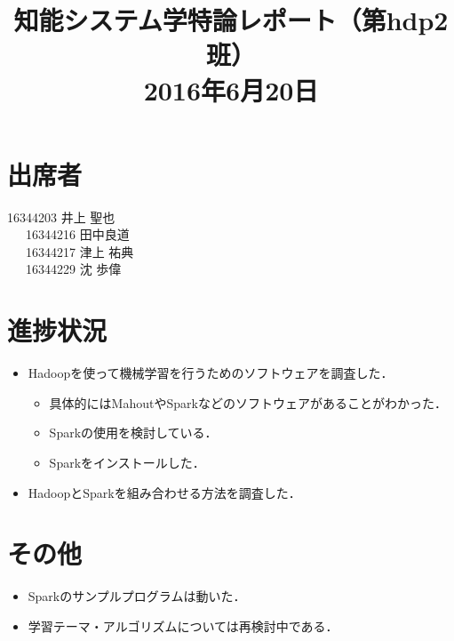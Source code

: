 \documentclass[a4paper,12pt]{jarticle}
\begin{document}
%
\title{\vspace{-30mm}知能システム学特論レポート（第hdp2班）\\ 2016年6月20日}
\date{}
%
%
\maketitle
%
\vspace{-30mm}
%
\section{出席者}
16344203 井上 聖也\\
~~~16344216 田中良道\\
~~~16344217 津上 祐典\\
~~~16344229 沈 歩偉
\section{進捗状況}
\begin{itemize}
 \item Hadoopを使って機械学習を行うためのソフトウェアを調査した．
	   \begin{itemize}
		\item 具体的にはMahoutやSparkなどのソフトウェアがあることがわかった．
		\item Sparkの使用を検討している．
		\item Sparkをインストールした． 
	   \end{itemize} 
 \item HadoopとSparkを組み合わせる方法を調査した．
\end{itemize}

\section{その他}
\begin{itemize}
 \item Sparkのサンプルプログラムは動いた．
 \item 学習テーマ・アルゴリズムについては再検討中である．
\end{itemize}
\end{document}
